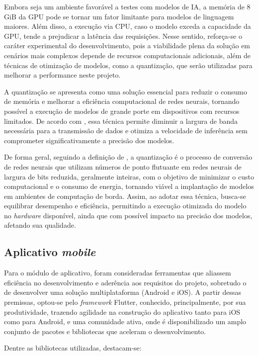 Embora seja um ambiente favorável a testes com modelos de IA, a memória de 8 GiB da GPU pode se tornar um fator limitante para modelos de linguagem maiores. Além disso, a execução via CPU, caso o modelo exceda a capacidade da GPU, tende a prejudicar a latência das requisições. Nesse sentido, reforça-se o caráter experimental do desenvolvimento, pois a viabilidade plena da solução em cenários mais complexos depende de recursos computacionais adicionais, além de técnicas de otimização de modelos, como a quantização, que serão utilizadas para melhorar a performance neste projeto.

A quantização se apresenta como uma solução essencial para reduzir o consumo de memória e melhorar a eficiência computacional de redes neurais, tornando possível a execução de modelos de grande porte em dispositivos com recursos limitados. De acordo com , essa técnica permite diminuir a largura de banda necessária para a transmissão de dados e otimiza a velocidade de inferência sem comprometer significativamente a precisão dos modelos.

De forma geral, seguindo a definição de , a quantização é o processo de conversão de redes neurais que utilizam números de ponto flutuante em redes neurais de largura de bits reduzida, geralmente inteiras, com o objetivo de minimizar o custo computacional e o consumo de energia, tornando viável a implantação de modelos em ambientes de computação de borda. Assim, ao adotar essa técnica, busca-se equilibrar desempenho e eficiência, permitindo a execução otimizada do modelo no \textit{hardware} disponível, ainda que com possível impacto na precisão dos modelos, afetando sua qualidade.

\subsection{Aplicativo \textit{mobile}}

Para o módulo de aplicativo, foram consideradas ferramentas que aliassem eficiência no desenvolvimento e aderência aos requisitos do projeto, sobretudo o de desenvolver uma solução multiplataforma (Android e iOS). A partir dessas premissas, optou-se pelo \textit{framework} Flutter, conhecido, principalmente, por sua produtividade, trazendo agilidade na construção do aplicativo tanto para iOS como para Android, e uma comunidade ativa, onde é disponibilizado um amplo conjunto de pacotes e bibliotecas que aceleram o desenvolvimento.

Dentre as bibliotecas utilizadas, destacam-se:

